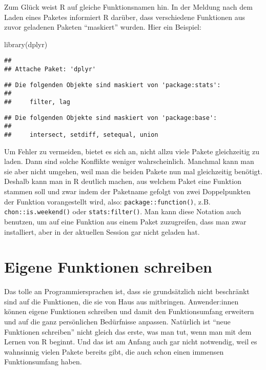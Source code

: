 \documentclass[
]{book}
\newenvironment{Shaded}{\begin{snugshade}}{\end{snugshade}}
\newcommand{\FunctionTok}[1]{\textcolor[rgb]{0.00,0.00,0.00}{#1}}
\newcommand{\NormalTok}[1]{#1}
\begin{document}
Zum Glück weist R auf gleiche Funktionsnamen hin. In der Meldung nach dem Laden eines Paketes informiert R darüber, dass verschiedene Funktionen aus zuvor geladenen Paketen ``maskiert'' wurden. Hier ein Beispiel:

\begin{Shaded}
\begin{Highlighting}[]
\FunctionTok{library}\NormalTok{(dplyr)}
\end{Highlighting}
\end{Shaded}

\begin{verbatim}
## 
## Attache Paket: 'dplyr'
\end{verbatim}

\begin{verbatim}
## Die folgenden Objekte sind maskiert von 'package:stats':
## 
##     filter, lag
\end{verbatim}

\begin{verbatim}
## Die folgenden Objekte sind maskiert von 'package:base':
## 
##     intersect, setdiff, setequal, union
\end{verbatim}

Um Fehler zu vermeiden, bietet es sich an, nicht allzu viele Pakete gleichzeitig zu laden. Dann sind solche Konflikte weniger wahrscheinlich. Manchmal kann man sie aber nicht umgehen, weil man die beiden Pakete nun mal gleichzeitig benötigt. Deshalb kann man in R deutlich machen, aus welchem Paket eine Funktion stammen soll und zwar indem der Paketname gefolgt von zwei Doppelpunkten der Funktion vorangestellt wird, also: \texttt{package::function()}, z.B. \texttt{chon::is.weekend()} oder \texttt{stats:filter()}. Man kann diese Notation auch benutzen, um auf eine Funktion aus einem Paket zuzugreifen, dass man zwar installiert, aber in der aktuellen Session gar nicht geladen hat.

\hypertarget{eigene-funktionen-schreiben}{%
\section{Eigene Funktionen schreiben}\label{eigene-funktionen-schreiben}}

Das tolle an Programmiersprachen ist, dass sie grundsätzlich nicht beschränkt sind auf die Funktionen, die sie von Haus aus mitbringen. Anwender:innen können eigene Funktionen schreiben und damit den Funktionsumfang erweitern und auf die ganz persönlichen Bedürfnisse anpassen. Natürlich ist ``neue Funktionen schreiben'' nicht gleich das erste, was man tut, wenn man mit dem Lernen von R beginnt. Und das ist am Anfang auch gar nicht notwendig, weil es wahnsinnig vielen Pakete bereits gibt, die auch schon einen immensen Funktionsumfang haben.
\end{document}
